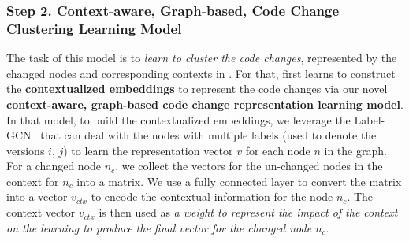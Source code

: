
\subsubsection{{\bf Step 2. Context-aware, Graph-based, Code Change Clustering Learning Model}} The task of this model is to {\em learn to cluster the code changes}, represented by
the changed nodes and corresponding contexts in {\mvpdg}. For
that, {\tool} first learns to construct the {\bf contextualized
  embeddings} to represent the code changes via our novel
{\bf context-aware, graph-based code change representation learning
  model}. In that model, to build the contextualized embeddings, we
leverage
the Label-GCN~\cite{label-gcn} that can deal with the nodes with
multiple labels (used to denote the versions $i$, $j$) to learn the
representation vector $v$ for each node $n$ in the graph. For a
changed node $n_c$, we collect the vectors for the un-changed nodes in
the context for $n_c$ into a matrix. We use a fully connected layer to
convert the matrix into a vector $v_{ctx}$ to encode the contextual
information for the node $n_c$. The context vector $v_{ctx}$ is then
used as {\em a weight to represent the impact of the context on the
  learning to produce the final vector for the changed node $n_c$}.

